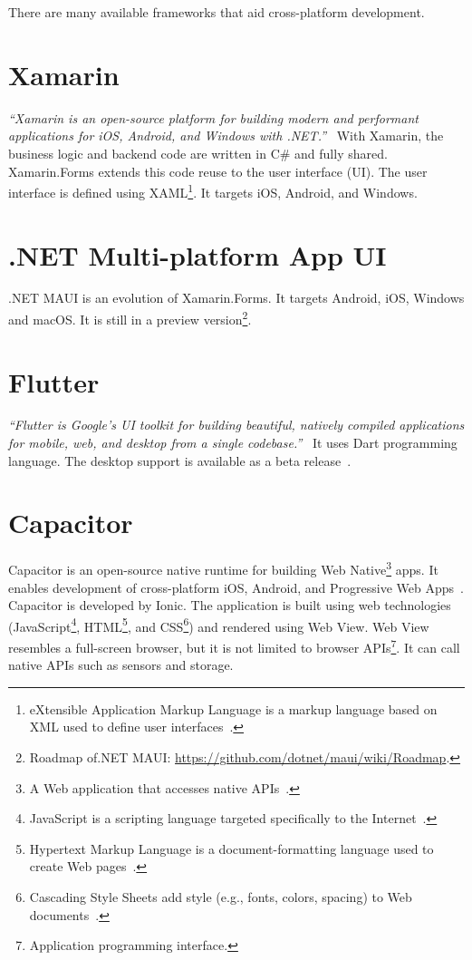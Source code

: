 \documentclass[
  digital, %
  table,   %
  oneside, %
  lof,     %
  lot,     %
]{fithesis3}
\begin{document}
There are many available frameworks that aid cross-platform development.

\section{Xamarin}
\textit{``Xamarin is an open-source platform for building modern and performant applications for iOS, Android, and Windows with .NET.''}~\cite{WhatIsXamarin} With Xamarin, the business logic and backend code are written in C\# and fully shared.
Xamarin.Forms extends this code reuse to the user interface (UI). The user interface is defined using XAML\footnote{eXtensible Application Markup Language is a markup language based on XML used to define user interfaces~\cite{Hermes2019Building}.}. It targets iOS, Android, and Windows.

\section{.NET Multi-platform App UI}
.NET MAUI is an evolution of Xamarin.Forms. It targets Android, iOS, Windows and macOS. It is still in a preview version\footnote{Roadmap of.NET MAUI: \url{https://github.com/dotnet/maui/wiki/Roadmap}.}.

\section{Flutter}
\textit{``Flutter is Google’s UI toolkit for building beautiful, natively compiled applications for mobile, web, and desktop from a single codebase.''}~\cite{FlutterHomepage} It uses Dart programming language. The desktop support is available as a beta release~\cite{FlutterDesktopSupport}.

\section{Capacitor}
Capacitor is an open-source native runtime for building Web Native\footnote{A Web application that accesses native APIs~\cite{WebNative}.} apps. It enables development of cross-platform iOS, Android, and Progressive Web Apps~\cite{CapacitorHomepage}. Capacitor is developed by Ionic. The application is built using web technologies (JavaScript\footnote{JavaScript is a scripting language targeted specifically to the Internet~\cite{GartnerJavaScript}.}, HTML\footnote{Hypertext Markup Language is a document-formatting language used to create Web pages~\cite{GartnerHTML}.}, and CSS\footnote{Cascading Style Sheets add style (e.g., fonts, colors, spacing) to Web documents~\cite{W3CCSS}.}) and rendered using Web View. Web View resembles a full-screen browser, but it is not limited to browser APIs\footnote{Application programming interface.}. It can call native APIs such as sensors and storage.
\end{document}
